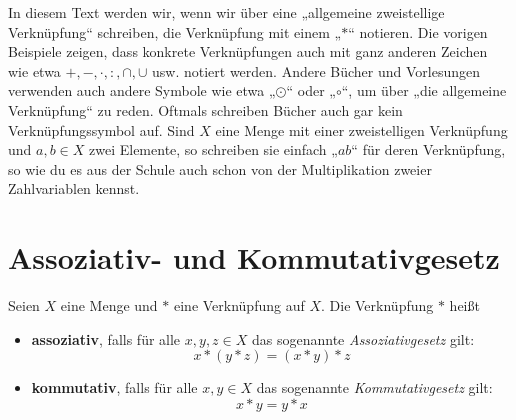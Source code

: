 \begin{bem}[Verknüpfungssymbole]
 In diesem Text werden wir, wenn wir über eine „allgemeine zweistellige Verknüpfung“ schreiben, die Verknüpfung mit einem „$*$“ notieren. Die vorigen Beispiele zeigen, dass konkrete Verknüpfungen auch mit ganz anderen Zeichen wie etwa $+,-,\cdot,:,\cap,\cup$ usw. notiert werden. Andere Bücher und Vorlesungen verwenden auch andere Symbole wie etwa „$\odot$“ oder „$\circ$“, um über „die allgemeine Verknüpfung“ zu reden. Oftmals schreiben Bücher auch gar kein Verknüpfungssymbol auf. Sind $X$ eine Menge mit einer zweistelligen Verknüpfung und $a,b\in X$ zwei Elemente, so schreiben sie einfach „$ab$“ für deren Verknüpfung, so wie du es aus der Schule auch schon von der Multiplikation zweier Zahlvariablen kennst. %
\end{bem}





\section{Assoziativ- und Kommutativgesetz}


\begin{de}
 Seien $X$ eine Menge und $*$ eine Verknüpfung auf $X$. Die Verknüpfung $*$ heißt
 \begin{itemize}
  \item \textbf{assoziativ}, falls für alle $x,y,z\in X$ das sogenannte \emph{Assoziativgesetz} gilt:
  \[ x*(y*z) = (x*y)*z \]
    \item \textbf{kommutativ}, falls für alle $x,y\in X$ das sogenannte \emph{Kommutativgesetz} gilt:
  \[ x*y = y*x \]
 \end{itemize}
\end{de}





